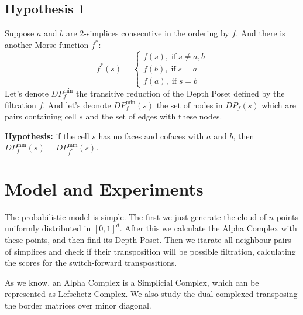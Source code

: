 \documentclass{article}
\begin{document}
\subsection{Hypothesis 1}
\par Suppose $a$ and $b$ are 2-simplices consecutive in the ordering by $f$. And there is another Morse function $f^*$:
$$
f^*(s) =
\begin{cases}
f(s), \; \text{if} \; s\ne a, b \\
f(b), \; \text{if} \; s = a \\
f(a), \; \text{if} \; s = b
\end{cases}
$$
Let's denote $DP_{f}^\text{min}$ the transitive reduction of the Depth Poset defined by the filtration $f$. And let's deonote $DP_{f}^\text{min}(s)$ the set of nodes in $DP_f(s)$ which are pairs containing cell $s$ and the set of edges with these nodes.

\par \textbf{Hypothesis:} if the cell $s$ has no faces and cofaces with $a$ and $b$, then $DP_f^\text{min}(s) = DP_{f^*}^\text{min}(s)$.


\section{Model and Experiments}

\par The probabilistic model is simple. The first we just generate the cloud of $n$ points uniformly distributed in $[0, 1]^d$. After this we calculate the Alpha Complex with these points, and then find its Depth Poset. Then we itarate all neighbour pairs of simplices and check if their transposition will be possible filtration, calculating the scores for the switch-forward transpositions.
\par As we know, an Alpha Complex is a Simplicial Complex, which can be represented as Lefschetz Complex. We also study the dual complexed transposing the border matrices over minor diagonal.
\end{document}

